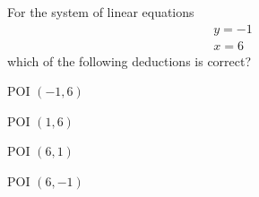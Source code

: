 \documentclass{webquiz}
\begin{document}
\begin{question} %
For the system of linear equations
\begin{gather*}
y=-1\\
x=6
\end{gather*}
which of the following deductions is correct?
\begin{choice}[columns=1] %
\incorrect POI $(-1,6)$

\incorrect POI $(1,6)$

\incorrect POI $(6,1)$

\correct POI $(6,-1)$
\end{choice}
\end{question}
\end{document}
